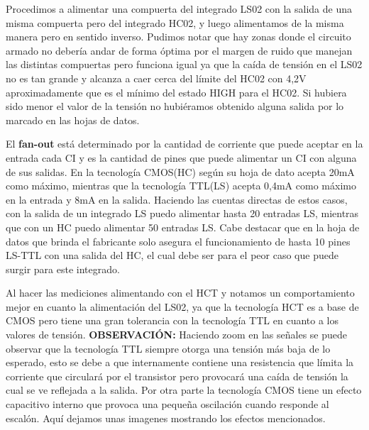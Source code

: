 Procedimos a alimentar una compuerta del integrado LS02 con la salida de una misma compuerta pero del integrado HC02, y luego alimentamos de la misma manera pero en sentido inverso. Pudimos notar que hay zonas donde el circuito armado no deber\'ia andar de forma \'optima por el margen de ruido que manejan las distintas compuertas pero funciona igual ya que la ca\'ida de tensi\'on en el LS02 no es tan grande y alcanza a caer cerca del l\'imite del HC02 con 4,2V aproximadamente que es el m\'inimo del estado HIGH para el HC02. Si hubiera sido menor el valor de la tensi\'on no hubi\'eramos obtenido alguna salida por lo marcado en las hojas de datos.
\newline

El \textbf{fan-out} est\'a determinado por la cantidad de corriente que puede aceptar en la entrada cada CI y es la cantidad de pines que puede alimentar un CI con alguna de sus salidas. En la tecnolog\'ia CMOS(HC) seg\'un su hoja de dato acepta 20mA como m\'aximo, mientras que la tecnolog\'ia TTL(LS) acepta 0,4mA como m\'aximo en la entrada y 8mA en la salida. Haciendo las cuentas directas de estos casos, con la salida de un integrado LS puedo alimentar hasta 20 entradas LS, mientras que con un HC puedo alimentar 50 entradas LS. Cabe destacar que en la hoja de datos que brinda el fabricante solo asegura el funcionamiento de hasta 10 pines LS-TTL con una salida del HC, el cual debe ser para el peor caso que puede surgir para este integrado.
\newline

Al hacer las mediciones alimentando con el HCT y notamos un comportamiento mejor en cuanto la alimentaci\'on del LS02, ya que la tecnolog\'ia HCT es a base de CMOS pero tiene una gran tolerancia con la tecnolog\'ia TTL en cuanto a los valores de tensi\'on.
\newline
\textbf{OBSERVACI\'ON:} Haciendo zoom en las señales se puede observar que la tecnolog\'ia TTL siempre otorga una tensi\'on m\'as baja de lo esperado, esto se debe a que internamente contiene una resistencia que l\'imita la corriente que circular\'a por el transistor pero provocar\'a una ca\'ida de tensi\'on la cual se ve reflejada a la salida. Por otra parte la tecnolog\'ia CMOS tiene un efecto capacitivo interno que provoca una pequeña oscilaci\'on cuando responde al escal\'on. Aqu\'i dejamos unas imagenes mostrando los efectos mencionados.

